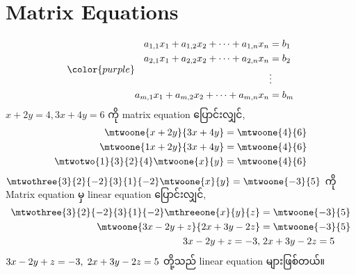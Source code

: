 \section{Matrix Equations}
\begin{equation}
    {\color{purple} \begin{split}
        a_{1,1}x_1+a_{1,2}x_2+\dots+a_{1,n}x_n&=b_1 \\
        a_{2,1}x_1+a_{2,2}x_2+\dots+a_{2,n}x_n&=b_2 \\
        &\vdots \\
        a_{m,1}x_1+a_{m,2}x_2+\dots+a_{m,n}x_n&=b_m \\
    \end{split}}
\end{equation}
$x+2y=4, 3x+4y=6$ ကို matrix equation ပြောင်းလျှင်,
\[
    \begin{split}
        \mtwoone{x+2y}{3x+4y}&=\mtwoone{4}{6} \\
        \mtwoone{1x+2y}{3x+4y}&=\mtwoone{4}{6} \\
        \mtwotwo{1}{3}{2}{4}\mtwoone{x}{y}&=\mtwoone{4}{6} \\
    \end{split}
\]
$\mtwothree{3}{2}{-2}{3}{1}{-2}\mtwoone{x}{y}=\mtwoone{-3}{5}$ ကို Matrix equation မှ linear equation ပြောင်းလျှင်,
\[
    \begin{split}
        \mtwothree{3}{2}{-2}{3}{1}{-2}\mthreeone{x}{y}{z}&=\mtwoone{-3}{5} \\
        \mtwoone{3x-2y+z}{2x+3y-2z}&=\mtwoone{-3}{5} \\
        3x-2y+z=-3,&\hspace{1mm}2x+3y-2z=5 \\
    \end{split}
\]
$3x-2y+z=-3,\hspace{1mm}2x+3y-2z=5$ တို့သည် linear equation များဖြစ်တယ်။
